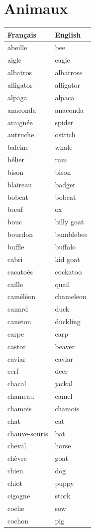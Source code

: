 \documentclass[12pt,a4paper]{article}
\begin{document}
\section{Animaux}
\begin{longtable}{p{4cm} p{6cm}}
\toprule
\textbf{Français} & \textbf{English} \\
\midrule
abeille & bee \\
aigle & eagle \\
albatros & albatross \\
alligator & alligator \\
alpaga & alpaca \\
anaconda & anaconda \\
araignée & spider \\
autruche & ostrich \\
baleine & whale \\
bélier & ram \\
bison & bison \\
blaireau & badger \\
bobcat & bobcat \\
bœuf & ox \\
bouc & billy goat \\
bourdon & bumblebee \\
buffle & buffalo \\
cabri & kid goat \\
cacatoès & cockatoo \\
caille & quail \\
caméléon & chameleon \\
canard & duck \\
caneton & duckling \\
carpe & carp \\
castor & beaver \\
caviar & caviar \\
cerf & deer \\
chacal & jackal \\
chameau & camel \\
chamois & chamois \\
chat & cat \\
chauve-souris & bat \\
cheval & horse \\
chèvre & goat \\
chien & dog \\
chiot & puppy \\
cigogne & stork \\
coche & sow \\
cochon & pig \\

\end{longtable}
\end{document}
